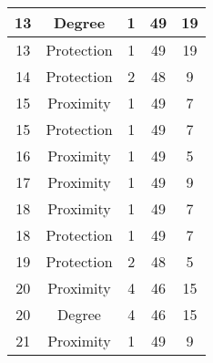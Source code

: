 \documentclass[results.tex]{subfiles}
\begin{document}
\begin{center}
\begin{tabular}{| c || c | c | c | c |}
            \hline
            13                      & Degree                       & 1                      & 49                      & 19                   \\
            \hline
            13                      & Protection                   & 1                      & 49                      & 19                   \\
            \hline
            14                      & Protection                   & 2                      & 48                      & 9                    \\
            \hline
            15                      & Proximity                    & 1                      & 49                      & 7                    \\
            \hline
            15                      & Protection                   & 1                      & 49                      & 7                    \\
            \hline
            16                      & Proximity                    & 1                      & 49                      & 5                    \\
            \hline
            17                      & Proximity                    & 1                      & 49                      & 9                    \\
            \hline
            18                      & Proximity                    & 1                      & 49                      & 7                    \\
            \hline
            18                      & Protection                   & 1                      & 49                      & 7                    \\
            \hline
            19                      & Protection                   & 2                      & 48                      & 5                    \\
            \hline
            20                      & Proximity                    & 4                      & 46                      & 15                   \\
            \hline
            20                      & Degree                       & 4                      & 46                      & 15                   \\
            \hline
            21                      & Proximity                    & 1                      & 49                      & 9                    \\

\end{tabular}
\end{center}
\end{document}
